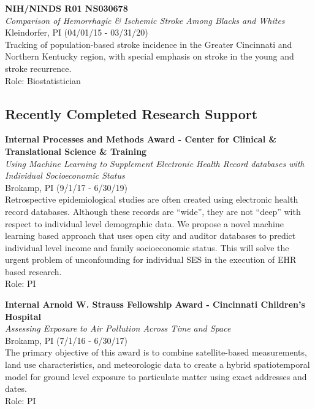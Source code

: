 \documentclass{nihbiosketch}
\begin{document}
\bigskip

\textbf{NIH/NINDS R01 NS030678}\\
\emph{Comparison of Hemorrhagic \& Ischemic Stroke Among Blacks and
Whites}\\
Kleindorfer, PI (04/01/15 - 03/31/20)\\
Tracking of population-based stroke incidence in the Greater Cincinnati
and Northern Kentucky region, with special emphasis on stroke in the
young and stroke recurrence.\\
Role: Biostatistician

\bigskip

\subsection*{Recently Completed Research Support}

\bigskip

\textbf{Internal Processes and Methods Award - Center for Clinical \&
  Translational Science \& Training}\\
\emph{Using Machine Learning to Supplement Electronic Health Record
  databases with Individual Socioeconomic Status}\\
Brokamp, PI (9/1/17 - 6/30/19)\\
Retrospective epidemiological studies are often created using electronic
health record databases. Although these records are ``wide'', they are
not ``deep'' with respect to individual level demographic data. We
propose a novel machine learning based approach that uses open city and
auditor databases to predict individual level income and family
socioeconomic status. This will solve the urgent problem of
unconfounding for individual SES in the execution of EHR based
research.\\
Role: PI

\bigskip

\textbf{Internal Arnold W. Strauss Fellowship Award - Cincinnati
Children's Hospital}\\
\emph{Assessing Exposure to Air Pollution Across Time and Space}\\
Brokamp, PI (7/1/16 - 6/30/17)\\
The primary objective of this award is to combine satellite-based
measurements, land use characteristics, and meteorologic data to create
a hybrid spatiotemporal model for ground level exposure to particulate
matter using exact addresses and dates.\\
Role: PI
\end{document}
